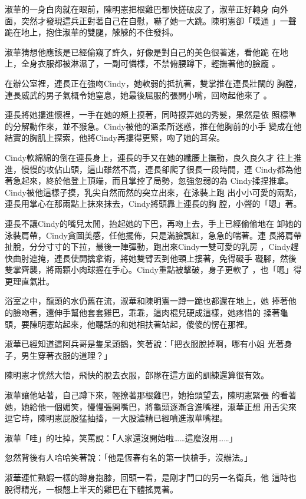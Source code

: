 淑華的一身白肉就在眼前，陳明憲把根雞巴都快搓破皮了，淑華正好轉身
向外面，突然才發現這兵正對著自己在自慰，嚇了她一大跳。陳明憲卻「噗通
」一聲跪在地上，抱住淑華的雙腿，觫觫的不住發抖。

淑華猜想他應該是已經偷窺了許久，好像是對自己的美色很著迷，看他跪
在地上，全身衣服都被淋濕了，一副可憐樣，不禁俯腰蹲下，輕撫著他的臉龐
。

在辦公室裡，連長正在強吻Cindy，她軟弱的抵抗著，雙掌推在連長壯闊的
胸膛，連長威武的男子氣概令她窒息，她最後屈服的張開小嘴，回吻起他來了
。

連長將她摟進懷裡，一手在她的頰上摸著，同時撩弄她的秀髮，果然是依
照標準的分解動作來，並不猴急。Cindy被他的溫柔所迷惑，推在他胸前的小手
變成在他結實的胸肌上探索，他將Cindy再摟得更緊，吻了她的耳朵。

Cindy軟綿綿的倒在連長身上，連長的手又在她的纖腰上撫動，良久良久才
往上推進，慢慢的攻佔山頭，這山雖然不高，連長卻爬了很長一段時間，連
Cindy都為他著急起來，終於他登上頂端，而且掌控了局勢，忽強忽弱的為
Cindy揉捏推拿。Cindy被他這樣子摸，乳尖自然而然的突立出來，在泳裝上跑
出小小可愛的兩點，連長用掌心在那兩點上抹來抹去，Cindy將頭靠上連長的胸
膛，小聲的「嗯」著。

連長不讓Cindy的嘴兒太閒，抬起她的下巴，再吻上去，手上已經偷偷地在
卸她的泳裝肩帶，Cindy貪圖美感，任他擺佈，只是滿臉飄紅，急急的喘著。連
長將肩帶扯脫，分分寸寸的下拉，最後一陣彈動，跑出來Cindy一雙可愛的乳房
，Cindy趕快曲肘遮掩，連長使開擒拿術，將她雙臂丟到他頸上摟著，免得礙手
礙腳，然後雙掌齊襲，將兩顆小肉球握在手心。Cindy重點被擊破，身子更軟了
，也「嗯」得更理直氣壯。

浴室之中，龍頭的水仍舊在流，淑華和陳明憲一蹲一跪也都還在地上，她
捧著他的臉吻著，還伸手幫他套套雞巴，乖乖，這肉棍兒硬成這樣，她疼惜的
揉著龜頭，要陳明憲站起來，他聽話的和她相扶著站起，傻傻的愣在那裡。

淑華已經知道這阿兵哥是隻呆頭鵝，笑著說：「把衣服脫掉啊，哪有小姐
光著身子，男生穿著衣服的道理？」

陳明憲才恍然大悟，飛快的脫去衣服，部隊在這方面的訓練還算很有效。

淑華讓他站著，自己蹲下來，輕撩著那根雞巴，她抬頭望去，陳明憲緊張
的看著她，她給他一個媚笑，慢慢張開嘴巴，將龜頭逐漸含進嘴裡，淑華正想
用舌尖來逗它時，陳明憲屁股猛抽搐，一大股濃精已經噴進淑華嘴裡。

淑華「哇」的吐掉，笑罵說：「人家還沒開始啦……這麼沒用……」

忽然背後有人哈哈笑著說：「他是恆春有名的第一快槍手，沒辦法。」

淑華連忙熟蝦一樣的蹲身抱膝，回頭一看，是剛才門口的另一名衛兵，他
這時也脫得精光，一根翹上半天的雞巴在下體搖晃著。

